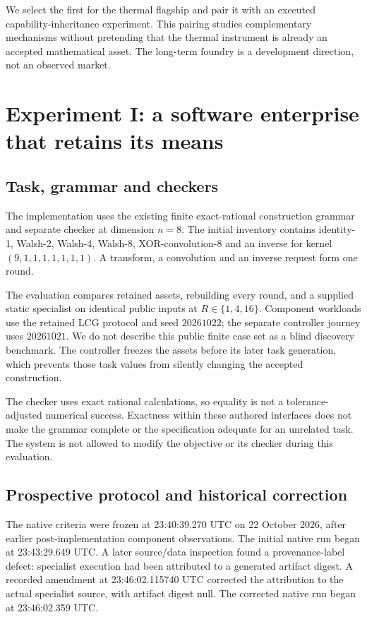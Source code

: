 \documentclass[11pt,a4paper]{article}
\begin{document}
We select the first for the thermal flagship and pair it with an executed capability-inheritance experiment. This pairing studies complementary mechanisms without pretending that the thermal instrument is already an accepted mathematical asset. The long-term foundry is a development direction, not an observed market.

\section{Experiment I: a software enterprise that retains its means}\label{sec:mathmethods}
\subsection{Task, grammar and checkers}
The implementation uses the existing finite exact-rational construction grammar and separate checker at dimension \(n=8\). The initial inventory contains identity-1, Walsh-2, Walsh-4, Walsh-8, XOR-convolution-8 and an inverse for kernel \((9,1,1,1,1,1,1,1)\). A transform, a convolution and an inverse request form one round.

The evaluation compares retained assets, rebuilding every round, and a supplied static specialist on identical public inputs at \(R\in\{1,4,16\}\). Component workloads use the retained LCG protocol and seed \(20261022\); the separate controller journey uses \(20261021\). We do not describe this public finite case set as a blind discovery benchmark. The controller freezes the assets before its later task generation, which prevents those task values from silently changing the accepted construction.

The checker uses exact rational calculations, so equality is not a tolerance-adjusted numerical success. Exactness within these authored interfaces does not make the grammar complete or the specification adequate for an unrelated task. The system is not allowed to modify the objective or its checker during this evaluation.

\subsection{Prospective protocol and historical correction}
The native criteria were frozen at 23:40:39.270 UTC on 22 October 2026, after earlier post-implementation component observations. The initial native run began at 23:43:29.649 UTC. A later source/data inspection found a provenance-label defect: specialist execution had been attributed to a generated artifact digest. A recorded amendment at 23:46:02.115740 UTC corrected the attribution to the actual specialist source, with artifact digest null. The corrected native run began at 23:46:02.359 UTC.
\end{document}

